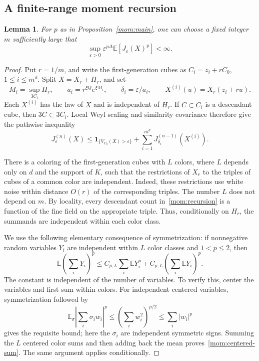\documentclass[11pt,letterpaper]{article}
\newcommand{\E}{\mathbb E}
\newcommand{\ind}{\mathbf 1}
\newcommand{\eps}{\varepsilon}
\newtheorem{lemma}[theorem]{Lemma}
\theoremstyle{definition}
\theoremstyle{remark}
\numberwithin{equation}{section}
\begin{document}
\subsection{A finite-range moment recursion}

\begin{lemma}\label{mom:tree-lp}
For $p$ as in Proposition~\ref{mom:main}, one can choose a fixed integer $m$ sufficiently large that
\begin{equation}\label{mom:tree-lp-bound}
 \sup_{\eps>0}\eps^{p\Delta}\E[J_\eps(X)^p]<\infty.
\end{equation}
\end{lemma}

\begin{proof}
Put $r=1/m$, and write the first-generation cubes as $C_i=z_i+rC_0$, $1\le i\le m^d$.  Split $X=X_r+H_r$, and set
\begin{equation*}
 M_i=\sup_{3C_i}H_r,\qquad
 a_i=r^{\xi Q}e^{\xi M_i},\qquad
 \delta_i=\eps/a_i,\qquad
 X^{(i)}(u)=X_r(z_i+ru).
\end{equation*}
Each $X^{(i)}$ has the law of $X$ and is independent of $H_r$. If $C\subset C_i$ is a descendant cube, then $3C\subset3C_i$. Local Weyl scaling and similarity covariance therefore give the pathwise inequality
\begin{equation}\label{mom:recursion}
 J_\eps^{(n)}(X)
 \le \ind_{\{V_{C_0}(X)>\eps\}}
       +\sum_{i=1}^{m^d}J_{\delta_i}^{(n-1)}(X^{(i)}).
\end{equation}

There is a coloring of the first-generation cubes with $L$ colors, where $L$ depends only on $d$ and the support of $K$, such that the restrictions of $X_r$ to the triples of cubes of a common color are independent.  Indeed, these restrictions use white noise within distance $O(r)$ of the corresponding triples.  The number $L$ does not depend on $m$. By locality, every descendant count in~\eqref{mom:recursion} is a function of the fine field on the appropriate triple.  Thus, conditionally on $H_r$, the summands are independent within each color class.

We use the following elementary consequence of symmetrization: if nonnegative random variables $Y_i$ are independent within $L$ color classes and $1<p\le2$, then
\begin{equation}\label{mom:centered-sum}
 \E\left(\sum_iY_i\right)^p
 \le C_{p,L}\sum_i\E Y_i^p
       +C_{p,L}\left(\sum_i\E Y_i\right)^p.
\end{equation}
The constant is independent of the number of variables. To verify this, center the variables and first sum within colors. For independent centered variables, symmetrization followed by
\begin{equation*}
 \E_{\sigma}\left|\sum_i\sigma_i w_i\right|^p
 \le\left(\sum_iw_i^2\right)^{p/2}
 \le\sum_i|w_i|^p
 \end{equation*}
gives the requisite bound; here the $\sigma_i$ are independent symmetric signs.  Summing the $L$ centered color sums and then adding back the mean proves~\eqref{mom:centered-sum}. The same argument applies conditionally.


\end{proof}
\end{document}

